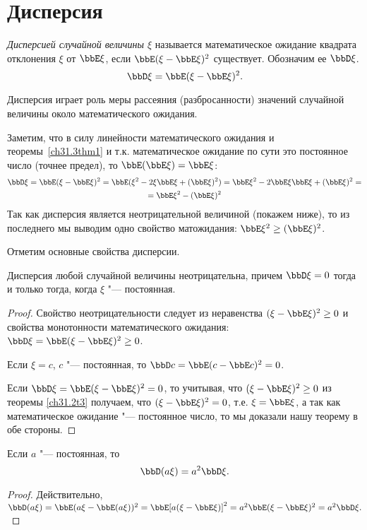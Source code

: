 \section{Дисперсия}
\begin{defn}
\textit{Дисперсией случайной величины $\xi$} называется математическое ожидание квадрата отклонения $\xi$ от $\bbE\xi$, если $\bbE(\xi-\bbE\xi)^2$ существует. Обозначим ее $\bbD\xi$. 
\begin{equation} \label{ch31.4eq1}
\bbD\xi=\bbE(\xi-\bbE\xi)^2.
\end{equation}
\end{defn}

Дисперсия играет роль меры рассеяния (разбросанности) значений случайной величины около математического ожидания.

Заметим, что в силу линейности математического ожидания и теоремы~\ref{ch31.3thm1}\; и т.к. математическое ожидание по сути это постоянное число (точнее предел), то $\bbE(\bbE\xi)=\bbE\xi$:
\begin{multline*}
\bbD\xi = \bbE(\xi-\bbE\xi)^2=\bbE(\xi^2-2\xi \bbE\xi+(\bbE\xi)^2)=\bbE\xi^2-2\bbE\xi \bbE\xi+(\bbE\xi)^2=\\=\bbE\xi^2-(\bbE\xi)^2
\end{multline*}
Так как дисперсия является неотрицательной величиной (покажем ниже), то из последнего мы выводим одно свойство матожидания: $\bbE\xi^2\ge(\bbE\xi)^2$.

Отметим основные свойства дисперсии.

\begin{thm} Дисперсия любой случайной величины неотрицательна, причем $\bbD\xi = 0$ тогда и только тогда, когда $\xi$ "--- постоянная. 
\end{thm}
\begin{proof}
Свойство неотрицательности следует из неравенства $(\xi - \bbE \xi)^2 \ge 0$ и свойства монотонности математического ожидания: $\bbD \xi = \bbE (\xi - \bbE \xi)^2 \ge 0$.

Если $\xi = c$, $c$ "--- постоянная, то $\bbD c = \bbE (c - \bbE c)^2 = 0$. 

Если $\bbD\xi=\bbE (\xi - \bbE \xi)^2=0$, то учитывая, что $(\xi - \bbE \xi)^2\ge 0$ из теоремы \ref{ch31.2t3} получаем, что $(\xi - \bbE \xi)^2=0$, т.е. $\xi=\bbE\xi$, а так как математическое ожидание "--- постоянное число, то мы доказали нашу теорему в обе стороны.
\end{proof}
\begin{thm} Если $a$ "--- постоянная, то $$\bbD(a\xi) = a^2 \bbD\xi.$$
\end{thm}
\begin{proof}
Действительно, $\bbD(a\xi) = \bbE(a\xi - \bbE (a\xi))^2 = \bbE [a (\xi - \bbE \xi)]^2 = a^2\bbE(\xi - \bbE\xi)^2 = a^2 \bbD\xi.$
\end{proof}

